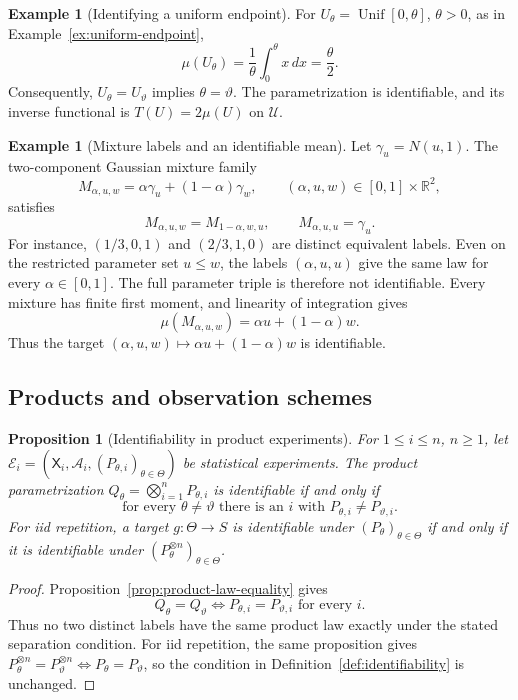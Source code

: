 \documentclass[11pt,oneside]{book}
\newtheorem{proposition}[theorem]{Proposition}
\theoremstyle{definition}
\newtheorem{example}[theorem]{Example}
\theoremstyle{remark}
\newcommand{\R}{\mathbb R}
\begin{document}
\begin{example}[Identifying a uniform endpoint]
\label{ex:identifiable-uniform-endpoint}
For $U_\theta=\operatorname{Unif}[0,\theta]$, $\theta>0$, as in
Example~\ref{ex:uniform-endpoint},
\[
\mu(U_\theta)=\frac1\theta\int_0^\theta x\,dx=\frac\theta2.
\]
Consequently, $U_\theta=U_\vartheta$ implies $\theta=\vartheta$.
The parametrization is identifiable, and its inverse functional is
$T(U)=2\mu(U)$ on $\mathcal U$.
\end{example}

\begin{example}[Mixture labels and an identifiable mean]
\label{ex:mixture-labels}
Let $\gamma_u=N(u,1)$. The two-component Gaussian mixture family
\[
M_{\alpha,u,w}=\alpha\gamma_u+(1-\alpha)\gamma_w,\qquad
(\alpha,u,w)\in[0,1]\times\R^2,
\]
satisfies
\[
M_{\alpha,u,w}=M_{1-\alpha,w,u},\qquad
M_{\alpha,u,u}=\gamma_u.
\]
For instance, $(1/3,0,1)$ and $(2/3,1,0)$ are distinct equivalent labels.
Even on the restricted parameter set $u\leq w$, the labels $(\alpha,u,u)$
give the same law for every $\alpha\in[0,1]$.
The full parameter triple is therefore not identifiable.
Every mixture has finite first moment, and linearity of integration gives
\[
\mu(M_{\alpha,u,w})=\alpha u+(1-\alpha)w.
\]
Thus the target $(\alpha,u,w)\mapsto\alpha u+(1-\alpha)w$ is identifiable.
\end{example}

\subsection{Products and observation schemes}
\label{subsec:identifiability-products}

\begin{proposition}[Identifiability in product experiments]
\label{prop:product-identifiability}
For $1\leq i\leq n$, $n\geq1$, let
$\mathcal E_i=(\mathsf X_i,\mathcal A_i,(P_{\theta,i})_{\theta\in\Theta})$
be statistical experiments.
The product parametrization
$Q_\theta=\bigotimes_{i=1}^nP_{\theta,i}$ is identifiable if and only if
\[
\text{for every }\theta\ne\vartheta
\text{ there is an }i\text{ with }P_{\theta,i}\ne P_{\vartheta,i}.
\]
For iid repetition, a target $g:\Theta\to S$ is identifiable under
$(P_\theta)_{\theta\in\Theta}$ if and only if it is identifiable under
$(P_\theta^{\otimes n})_{\theta\in\Theta}$.
\end{proposition}
\begin{proof}
Proposition~\ref{prop:product-law-equality} gives
\[
Q_\theta=Q_\vartheta
\iff P_{\theta,i}=P_{\vartheta,i}\text{ for every }i.
\]
Thus no two distinct labels have the same product law exactly under the
stated separation condition.
For iid repetition, the same proposition gives
$P_\theta^{\otimes n}=P_\vartheta^{\otimes n}\iff P_\theta=P_\vartheta$,
so the condition in Definition~\ref{def:identifiability} is unchanged.
\end{proof}
\end{document}
